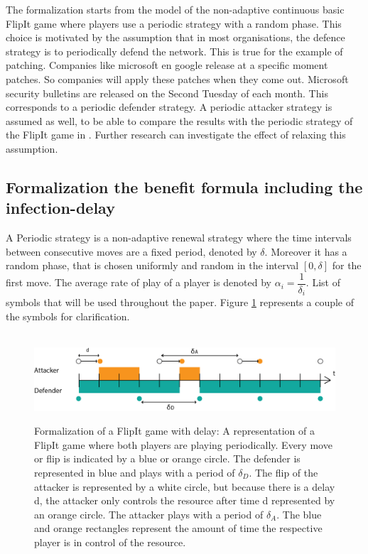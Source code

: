 The formalization starts from the model of the non-adaptive continuous basic FlipIt game where players use a periodic strategy with a random phase. This choice is motivated by the assumption that in most organisations, the defence strategy is to periodically defend the network.  This is true for the example of patching. Companies like microsoft en google release at a specific moment patches. So companies will apply these patches when they come out. Microsoft security bulletins are released on the Second Tuesday of each month. 
This corresponds to a periodic defender strategy.  A periodic attacker strategy is assumed as well, to be able to compare the results with the periodic strategy of the FlipIt game in \cite{FlipIt}. %
Further research can investigate the effect of relaxing this assumption. \\


\subsection{Formalization the benefit formula including the infection-delay}


 A Periodic strategy is a non-adaptive renewal strategy where the time intervals between consecutive moves are a fixed period, denoted by $\delta$. Moreover it has a random phase, that is chosen uniformly and random in the interval $[0,\delta]$ for the first move. The average rate of play of a player is denoted by $\alpha_{i} = \dfrac{1}{\delta_{i}}$. List of symbols that will be used throughout the paper. Figure \ref{FlipItDelay} represents a couple of the symbols for clarification.\\
~~\\
\begin{figure}[hbtp]
\caption{Formalization of a FlipIt game with delay: A representation of a FlipIt game where both players are playing periodically. Every move or flip is indicated by a blue or orange circle.  The defender is represented in blue and plays with a period of $\delta_{D}$. The flip of the attacker is represented by a white circle, but because there is a delay d, the attacker only controls the resource after time d represented by an orange circle. The attacker plays with a period of $\delta_{A}$. The blue and orange rectangles represent the amount of time the respective player is in control of the resource.}
\centering
\includegraphics[scale=0.7]{Images/DefFlip.png}
\label{FlipItDelay}
\end{figure}

